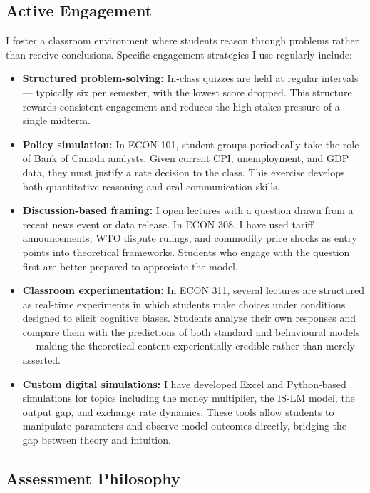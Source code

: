 \documentclass[11pt,letterpaper]{article}
\begin{document}
\subsection{Active Engagement}

I foster a classroom environment where students reason through problems rather than receive conclusions. Specific engagement strategies I use regularly include:

\begin{itemize}
  \item \textbf{Structured problem-solving:} In-class quizzes are held at regular intervals --- typically six per semester, with the lowest score dropped. This structure rewards consistent engagement and reduces the high-stakes pressure of a single midterm.

  \item \textbf{Policy simulation:} In ECON 101, student groups periodically take the role of Bank of Canada analysts. Given current CPI, unemployment, and GDP data, they must justify a rate decision to the class. This exercise develops both quantitative reasoning and oral communication skills.

  \item \textbf{Discussion-based framing:} I open lectures with a question drawn from a recent news event or data release. In ECON 308, I have used tariff announcements, WTO dispute rulings, and commodity price shocks as entry points into theoretical frameworks. Students who engage with the question first are better prepared to appreciate the model.

  \item \textbf{Classroom experimentation:} In ECON 311, several lectures are structured as real-time experiments in which students make choices under conditions designed to elicit cognitive biases. Students analyze their own responses and compare them with the predictions of both standard and behavioural models --- making the theoretical content experientially credible rather than merely asserted.

  \item \textbf{Custom digital simulations:} I have developed Excel and Python-based simulations for topics including the money multiplier, the IS-LM model, the output gap, and exchange rate dynamics. These tools allow students to manipulate parameters and observe model outcomes directly, bridging the gap between theory and intuition.
\end{itemize}

\subsection{Assessment Philosophy}
\end{document}
